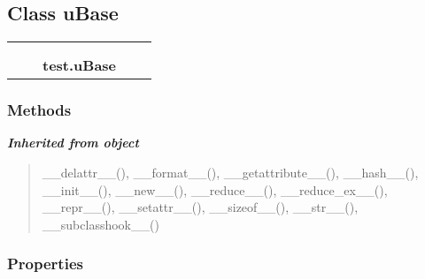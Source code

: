 
\subsection{Class uBase}

    \label{test:uBase}
\begin{tabular}{cccccc}
\multicolumn{2}{r}{\settowidth{\BCL}{object}\multirow{2}{\BCL}{object}}
&&
  \\\cline{3-3}
  &&\multicolumn{1}{c|}{}
&&
  \\
&&\multicolumn{2}{l}{\textbf{test.uBase}}
\end{tabular}



  \subsubsection{Methods}


\large{\textbf{\textit{Inherited from object}}}

\begin{quote}
\_\_delattr\_\_(), \_\_format\_\_(), \_\_getattribute\_\_(), \_\_hash\_\_(), \_\_init\_\_(), \_\_new\_\_(), \_\_reduce\_\_(), \_\_reduce\_ex\_\_(), \_\_repr\_\_(), \_\_setattr\_\_(), \_\_sizeof\_\_(), \_\_str\_\_(), \_\_subclasshook\_\_()
\end{quote}


  \subsubsection{Properties}

